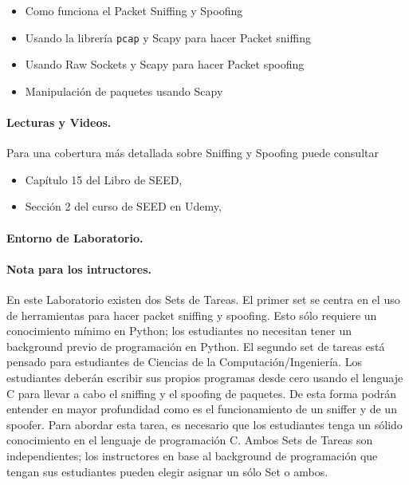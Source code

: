 \begin{itemize}[noitemsep]
\item Como funciona el Packet Sniffing y Spoofing
\item Usando la librería {\tt pcap} y Scapy para hacer Packet sniffing
\item Usando Raw Sockets y Scapy para hacer Packet spoofing 
\item Manipulación de paquetes usando Scapy
\end{itemize}



\paragraph{Lecturas y Videos.}
Para una cobertura más detallada sobre Sniffing y Spoofing puede consultar


\begin{itemize}
\item Capítulo 15 del Libro de SEED, \seedbook

\item Sección 2 del curso de SEED en Udemy, \seedisvideo
\end{itemize}



\paragraph{Entorno de Laboratorio.} \seedenvironmentC



\paragraph{Nota para los intructores.}
En este Laboratorio existen dos Sets de Tareas. El primer set se centra en el uso de herramientas para hacer packet sniffing y spoofing. Esto sólo requiere un conocimiento mínimo en Python; los estudiantes no necesitan tener un background previo de programación en Python.
El segundo set de tareas está pensado para estudiantes de Ciencias de la Computación/Ingeniería. 
Los estudiantes deberán escribir sus propios programas desde cero usando el lenguaje C para llevar a cabo el sniffing y el spoofing de paquetes. De esta forma podrán entender en mayor profundidad como es el funcionamiento de un sniffer y de un spoofer. Para abordar esta tarea, es necesario que los estudiantes tenga un sólido conocimiento en el lenguaje de programación C.
Ambos Sets de Tareas son independientes; los instructores en base al background de programación que tengan sus estudiantes pueden elegir asignar un sólo Set o ambos.



